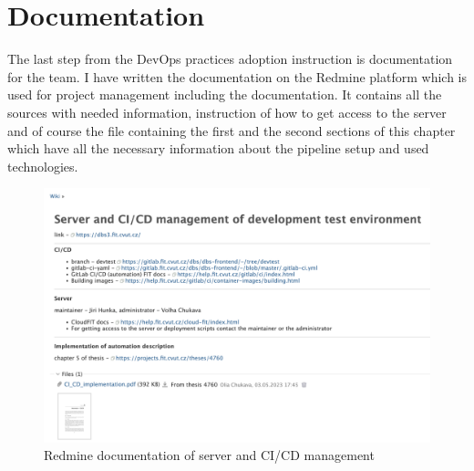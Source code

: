 \section{Documentation} The last step from the DevOps practices adoption instruction is documentation for the team. I have written the documentation on the Redmine platform which is used for project management including the documentation. It contains all the sources with needed information, instruction of how to get access to the server and of course the file containing the first and the second sections of this chapter which have all the necessary information about the pipeline setup and used technologies. 
\newpage
\begin{figure}[ht]
\centering
\includegraphics[scale=0.5]{../png/redmine.png}
\caption{Redmine documentation of server and CI/CD management}
\end{figure}
